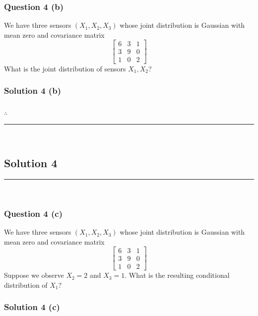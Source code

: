 \documentclass{article}
\begin{document}
\subsubsection*{Question 4 (b)}
\begin{flushleft}
    We have three sensors $(X_1, X_2, X_3)$ whose joint distribution is Gaussian with mean zero and covariance matrix 
    \[
    \begin{bmatrix}
    6 & 3 & 1 \\
    3 & 9 & 0 \\
    1 & 0 & 2
    \end{bmatrix}
    \]
    What is the joint distribution of sensors $X_1, X_2$? 
\end{flushleft}

\subsubsection*{Solution 4 (b)}


\subsubsection*{\normalfont}{$\therefore$ }

\noindent\rule{\textwidth}{0.4pt}\\

\newpage

\subsection*{Solution 4}
\noindent\rule{\textwidth}{0.4pt}\\
\subsubsection*{Question 4 (c)}
\begin{flushleft}
    We have three sensors $(X_1, X_2, X_3)$ whose joint distribution is Gaussian with mean zero and covariance matrix 
    \[
    \begin{bmatrix}
    6 & 3 & 1 \\
    3 & 9 & 0 \\
    1 & 0 & 2
    \end{bmatrix}
    \]
    Suppose we observe $X_2=2$ and $X_3=1$. 
    What is the resulting conditional distribution of $X_1$? 
\end{flushleft}

\subsubsection*{Solution 4 (c)}
\end{document}
